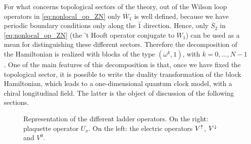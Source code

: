 For what concerns topological sectors of the theory,
out of the Wilson loop operators in \eqref{eq:nonlocal_op_ZN} only $\overline{W}_1$ is well defined, because we have periodic boundary conditions only along the $\hat{1}$ direction.
Hence, only $\overline{S}_2$ in \eqref{eq:nonlocal_op_ZN} (the 't Hooft operator conjugate to $W_1$) can be used as a mean for distinguishing these different sectors.
Therefore the decomposition of the Hamiltonian is realized with blocks of the type $(\omega^k,1)$, with $k=0,\dots,N-1$.
One of the main features of this decomposition is that, once we have fixed the topological sector, it is possible to write the duality transformation of the block Hamiltonian, which leads to a one-dimensional quantum clock model, with a chiral longitudinal field.
The latter is the object of discussion of the following sections.


\begin{figure}
    \centering
    
    \caption{Representation of the different ladder operators. On the right: plaquette operator $U_x$. On the left: the electric operators $V^{\uparrow}$, $V^{\downarrow}$ and $V^0$.}
    \label{fig:ladder_operators}
\end{figure}
